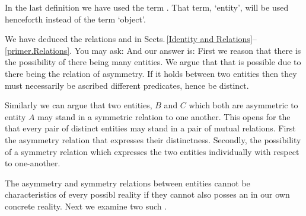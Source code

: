 \noindent
\begynd
\pind In the last definition we have used the term . 
\pind That term, `entity', will be used henceforth instead of the term `object'.
\afslut

\mnewfoil

\begynd
\pind We have deduced the relations
\begynd
\pind {} and
\pind {}
\afslut
\pos{}{\end{multicols}} in Sects.\,\ref{Identity and Relations}--\ref{primer.Relations}. 
\begynd
\pind You may ask: 
\pind And our answer is:  
\pind First we reason that 
\begynd
\pind there is the possibility of there being
      many entities.
\afslut 
\pind We argue that
\begynd
\pind  that is possible due to there being the relation
      of asymmetry.
\afslut 
\pind If it holds between two entities 
\begynd
\pind then they must necessarily be ascribed different predicates,
\afslut 
\pind hence be distinct.
\afslut 
\afslut 
\mnewfoil

\begynd
\pind Similarly we can argue that two entities, $B$ and $C$ which both
      are asymmetric  to entity $A$
\begynd
\pind may stand in a symmetric relation to one another.
\afslut 
\pind This opens for the  that every pair of
      distinct entities may stand in a pair of mutual relations.
\begynd
\pind First the asymmetry relation that expresses their distinctness.
\pind Secondly, the possibility of a symmetry relation which expresses
      the two entities individually with respect to one-another.
\afslut
\pind {}
\afslut

\label{f:Space and Time}

\begynd
\pind The asymmetry and symmetry relations between entities
\begynd
\pind cannot be  characteristics of every possibl reality
\pind if they cannot also posses an  in
      our own concrete reality.
\afslut
\pind Next we examine two such .
\afslut


